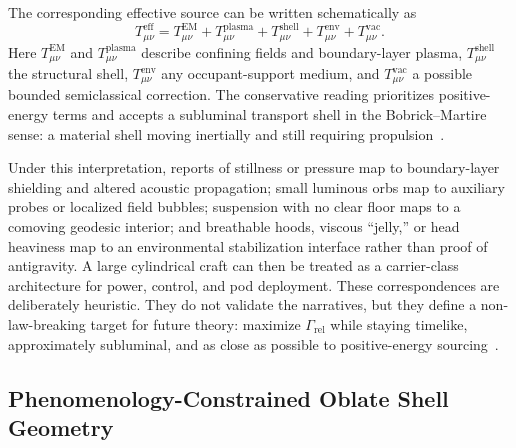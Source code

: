 \documentclass[aps,prd,twocolumn,superscriptaddress,nofootinbib,floatfix]{revtex4-2}
\begin{document}
The corresponding effective source can be written schematically as
\begin{equation}
T^{\mathrm{eff}}_{\mu\nu} =
T^{\mathrm{EM}}_{\mu\nu} +
T^{\mathrm{plasma}}_{\mu\nu} +
T^{\mathrm{shell}}_{\mu\nu} +
T^{\mathrm{env}}_{\mu\nu} +
T^{\mathrm{vac}}_{\mu\nu}.
\label{eq:s09-effective-source}
\end{equation}
Here $T^{\mathrm{EM}}_{\mu\nu}$ and $T^{\mathrm{plasma}}_{\mu\nu}$ describe
confining fields and boundary-layer plasma, $T^{\mathrm{shell}}_{\mu\nu}$ the
structural shell, $T^{\mathrm{env}}_{\mu\nu}$ any occupant-support medium, and
$T^{\mathrm{vac}}_{\mu\nu}$ a possible bounded semiclassical correction. The
conservative reading prioritizes positive-energy terms and accepts a
subluminal transport shell in the Bobrick--Martire sense: a material shell
moving inertially and still requiring
propulsion~\cite{BobrickMartire2021,Fuchs2024}.

Under this interpretation, reports of stillness or pressure map to
boundary-layer shielding and altered acoustic propagation; small luminous orbs
map to auxiliary probes or localized field bubbles; suspension with no clear
floor maps to a comoving geodesic interior; and breathable hoods, viscous
``jelly,'' or head heaviness map to an environmental stabilization interface
rather than proof of antigravity. A large cylindrical craft can then be treated
as a carrier-class architecture for power, control, and pod deployment. These
correspondences are deliberately heuristic. They do not validate the narratives,
but they define a non-law-breaking target for future theory: maximize
$\Gamma_{\mathrm{rel}}$ while staying timelike, approximately subluminal, and
as close as possible to positive-energy
sourcing~\cite{DIRD_Green,NASA_UAP2023,Fowler1995}.

\subsection{Phenomenology-Constrained Oblate Shell Geometry}\label{sec:oblate-shell}
\end{document}
